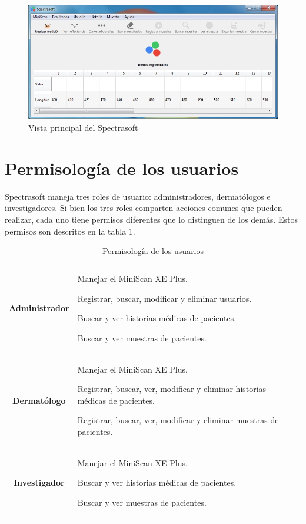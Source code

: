 \begin{figure}[H]
  \centering
  \includegraphics[width=1\linewidth]{./img/vista-principal.jpg}
\caption[]{Vista principal del Spectrasoft\label{fig:vista-principal}}
\end{figure}
\vfill
\newpage

\section*{Permisolog\'{i}a de los usuarios}

	Spectrasoft maneja tres roles de usuario: administradores, dermat\'{o}logos e investigadores. Si bien los tres roles comparten acciones comunes que pueden realizar, cada uno tiene permisos diferentes que lo distinguen de los dem\'{a}s. Estos permisos son descritos en la tabla 1.

\begin{table}[h]
		\small
		\caption[]{Permisolog\'{i}a de los usuarios}
		\centering
		\setlength{\extrarowheight}{\altocelda}
		\begin{tabulary}{\anchotabla}{|c|J|}
			\hline
			 & \\ \hline
			
			\textbf{Administrador} &
			
			Manejar el MiniScan XE Plus.
			
			Registrar, buscar, modificar y eliminar usuarios.
			
			Buscar y ver historias m\'{e}dicas de pacientes.
			
			Buscar y ver muestras de pacientes.\\ \hline
			
			\textbf{Dermat\'{o}logo} &
			
			Manejar el MiniScan XE Plus.
			
			Registrar, buscar, ver, modificar y eliminar historias m\'{e}dicas de pacientes.
			
			Registrar, buscar, ver, modificar y eliminar muestras de pacientes.\\ \hline
			
			\textbf{Investigador} &
			
			Manejar el MiniScan XE Plus.
			
			Buscar y ver historias m\'{e}dicas de pacientes.
			
			Buscar y ver muestras de pacientes.\\ \hline
		\end{tabulary}
	\end{table}

